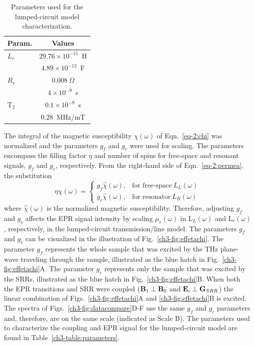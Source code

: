 \begin{table}[hbtp]
\centering
\caption{Parameters used for the lumped-circuit model characterization.}
\begin{tabular}{l|c}
\multicolumn{1}{l|}{Param.} & \multicolumn{1}{c}{Values} \\ \hline \hline
\multicolumn{1}{l|}{$L_r$} & \multicolumn{1}{c}{$29.76\times 10^{-15}$~H} \\
\rowcolor[rgb]{0.937,0.937,0.937}  
\multicolumn{1}{l|}{$C_r$} & \multicolumn{1}{c}{$4.89\times 10^{-12} $~F} \\
\multicolumn{1}{l|}{$R_r$} & \multicolumn{1}{c}{$0.008~\Omega$} \\
\rowcolor[rgb]{0.937,0.937,0.937}  
\multicolumn{1}{l|}{T$_1$} & \multicolumn{1}{c}{$4\times 10^{-9}$~s} \\
\multicolumn{1}{l|}{T$_2$} & \multicolumn{1}{c}{$0.1\times 10^{-9}$~s} \\
\rowcolor[rgb]{0.937,0.937,0.937}  
\multicolumn{1}{l|}{$\gamma$} & \multicolumn{1}{c}{$0.28$~MHz/mT}
\end{tabular}\label{ch3-table:lumpedparameters}
\end{table}

The integral of the magnetic susceptibility $\chi(\omega)$ of Eqn.~\ref{eq-2:chi} was normalized and the parameters $g_f$ and $g_r$ were used for scaling. The parameters encompass the filling factor $\eta$ and number of spins for free-space and resonant signals, $g_f$ and $g_r$, respectively. From the right-hand side of Eqn.~\ref{eq-2:permea}, the substitution
\begin{equation}
    \eta \chi(\omega) =
    \begin{cases}
      g_f \hat{\chi}(\omega), & \text{for free-space}\ L_L(\omega) \\
      g_r \hat{\chi}(\omega), & \text{for resonator}\ L_R(\omega)
    \end{cases}
\end{equation}\label{etagfgr}
where $\hat{\chi}(\omega)$ is the normalized magnetic susceptibility. Therefore, adjusting  $g_f$ and $g_r$ affects the EPR signal intensity by scaling $\mu_r(\omega)$ in L$_L(\omega)$ and L$_r(\omega)$, respectively, in the lumped-circuit transmission\-/line model. The parameters $g_f$ and $g_r$ can be visualized in the illustration of Fig.~\ref{ch3-fig:effetachi}. The parameter $g_f$ represents the whole sample that was excited by the THz plane-wave traveling through the sample, illustrated as the blue hatch in Fig.~\ref{ch3-fig:effetachi}A. The parameter $g_r$ represents only the sample that was excited by the SRRs, illustrated as the blue hatch in Fig.~\ref{ch3-fig:effetachi}B. When both the EPR transitions and SRR were coupled ($\textbf{B}_{1}\perp\textbf{B}_{0}$ and $\textbf{E}_{i}\perp\textbf{G}_{SRR}$) the linear combination of Figs.~\ref{ch3-fig:effetachi}A and \ref{ch3-fig:effetachi}B is excited. The spectra of Figs.~\ref{ch3-fig:datacompare}D-F use the same $g_f$ and $g_r$ parameters and, therefore, are on the same scale (indicated as Scale B). The parameters used to characterize the coupling and EPR signal for the lumped-circuit model are found in Table~\ref{ch3-table:parameters}.

